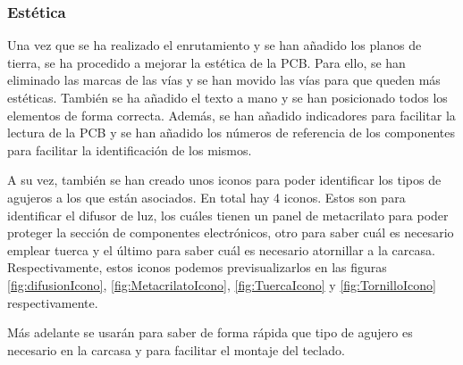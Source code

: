 \subsubsection{Estética}
Una vez que se ha realizado el enrutamiento y se han añadido los planos de tierra, se ha procedido a mejorar la estética de la \gls{PCB}. Para ello, se han eliminado las marcas de las vías y se han movido las vías para que queden más estéticas. También se ha añadido el texto a mano y se han posicionado todos los elementos de forma correcta. Además, se han añadido indicadores para facilitar la lectura de la \gls{PCB} y se han añadido los números de referencia de los componentes para facilitar la identificación de los mismos.

A su vez, también se han creado unos iconos para poder identificar los tipos de agujeros a los que están asociados. En total hay 4 iconos. Estos son para identificar el difusor de luz, los cuáles tienen un panel de metacrilato para poder proteger la sección de componentes electrónicos, otro para saber cuál es necesario emplear tuerca y el último para saber cuál es necesario atornillar a la carcasa. Respectivamente, estos iconos podemos previsualizarlos en las figuras \ref{fig:difusionIcono}, \ref{fig:MetacrilatoIcono}, \ref{fig:TuercaIcono} y \ref{fig:TornilloIcono} respectivamente.

Más adelante se usarán para saber de forma rápida que tipo de agujero es necesario en la carcasa y para facilitar el montaje del teclado.

